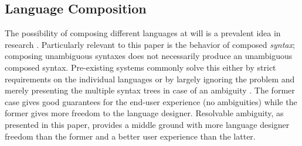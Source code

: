 \documentclass[runningheads]{llncs}
\begin{document}


\subsection{Language Composition}

The possibility of composing different languages at will is a prevalent idea in research \cite{vanwykSilverExtensibleAttribute2010,lorenzenSoundTypedependentSyntactic2016,danielssonParsingMixfixOperators2011}. Particularly relevant to this paper is the behavior of composed \emph{syntax}; composing unambiguous syntaxes does not necessarily produce an unambiguous composed syntax. Pre-existing systems commonly solve this either by strict requirements on the individual languages \cite{vanwykSilverExtensibleAttribute2010} or by largely ignoring the problem and merely presenting the multiple syntax trees in case of an ambiguity \cite{lorenzenSoundTypedependentSyntactic2016,danielssonParsingMixfixOperators2011}. The former case gives good guarantees for the end-user experience (no ambiguities) while the former gives more freedom to the language designer. Resolvable ambiguity, as presented in this paper, provides a middle ground with more language designer freedom than the former and a better user experience than the latter.
\end{document}
